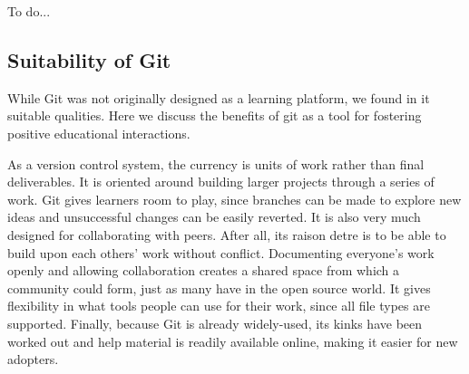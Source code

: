 \documentclass[12pt,twoside,vi]{mitthesis}
\newcommand{\wip}[1]{{\color{red} To do...}}
\begin{document}
\wip{We also aimed to foster a community that would extend into the later phases of the Accelerator. 

Finally, we rely on good software development practices and use popular tools where possible.

Communication. Communication lays the groundwork for the type of community formed. We aim to have instructors clearly communicate how to use the platform and be able to guide students throughout the course. We would like to allow natural and structured opportunities to ask questions and give feedback. General course information should be readily accessible to students.

Permissions. We will have to decide how to control authority to perform actions and visibility of content. On one hand, we believe that the platform should be as open as possible. This would allow students the opportunity to pursue their curiosities, to learn from each other's work, and to feel that they have a complete understanding of the platform. On the other hand, we would like to prevent either intentional or accidental actions that may destroy or hinder other participants' work. We also anticipate that sensitive topics would not be expressed without a private way of doing so and thus would like to allow for that.}

\subsection{Suitability of Git}

While Git was not originally designed as a learning platform, we found in it suitable qualities. Here we discuss the benefits of git as a tool for fostering positive educational interactions.

As a version control system, the currency is units of work rather than final deliverables. It is oriented around building larger projects through a series of work. Git gives learners room to play, since branches can be made to explore new ideas and unsuccessful changes can be easily reverted. It is also very much designed for collaborating with peers. After all, its raison detre is to be able to build upon each others' work without conflict. Documenting everyone's work openly and allowing collaboration creates a shared space from which a community could form, just as many have in the open source world. It gives flexibility in what tools people can use for their work, since all file types are supported. Finally, because Git is already widely-used, its kinks have been worked out and help material is readily available online, making it easier for new adopters.
\end{document}
